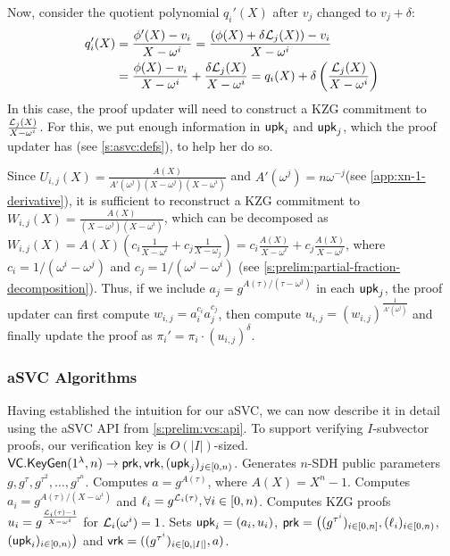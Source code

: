 Now, consider the quotient polynomial $q_i'(X)$ after $v_j$ changed to $v_j+\delta$:
{\ifCameraReady\small\fi
\begin{align}
q_i'(X) &= \frac{\phi'(X)-v_i}{X-\omega^i}=\frac{\left(\phi(X) + \delta\mathcal{L}_j(X)\right) - v_i}{X-\omega^i}\\
        &= \frac{\phi(X) - v_i}{X-\omega^i}+\frac{\delta\mathcal{L}_j(X)}{X-\omega^i} = q_i(X) + \delta\left(\frac{\mathcal{L}_j(X)}{X-\omega^i}\right)
\end{align}
}%
In this case, the proof updater will need to construct a KZG commitment to $\frac{\mathcal{L}_j(X)}{X-\omega^i}$.
For this, we put enough information in $\mathsf{upk}_i$ and $\mathsf{upk}_j$, which the proof updater has (see \cref{s:asvc:defs}), to help her do so.

Since $U_{i,j}(X)=\frac{A(X)}{A'(\omega^j)(X-\omega^j)(X-\omega^i)}$ and $A'(\omega^j) = n\omega^{-j}$\ifNotCameraReady\xspace(see \cref{app:xn-1-derivative})\fi, it is sufficient to reconstruct a KZG commitment to $W_{i,j}(X)=\frac{A(X)}{(X-\omega^j)(X-\omega^i)}$, which can be decomposed as $W_{i,j}(X)=A(X) \left(c_i \frac{1}{X-\omega^i} + c_j \frac{1}{X-\omega_j}\right) = c_i \frac{A(X)}{X-\omega^i} + c_j \frac{A(X)}{X-\omega^j}$, where $c_i = 1/(\omega^i-\omega^j)$ and $c_j=1/(\omega^j-\omega^i)$ (see \cref{s:prelim:partial-fraction-decomposition}).
Thus, if we include $a_j=g^{{A(\tau)}/(\tau-\omega^j)}$ in each $\mathsf{upk}_j$, the proof updater can first compute $w_{i,j} = a_i^{c_i} a_j^{c_j}$, then compute $u_{i,j}=\left(w_{i,j}\right)^{\frac{1}{A'(\omega^j)}}$ and finally update the proof as  $\pi_i' = \pi_i \cdot (u_{i,j})^\delta$.

\subsubsection{aSVC Algorithms}
\label{s:asvc:from-kzg:algorithms}
Having established the intuition for our aSVC, we can now describe it in detail using the aSVC API from \cref{s:prelim:vcs:api}.
\ifNotCameraReady
To support verifying $I$-subvector proofs, our verification key is $O(|I|)$-sized.
\fi
\\

\api $\mathsf{VC}.\mathsf{KeyGen}(1^\lambda, n) \rightarrow \mathsf{prk},\mathsf{vrk},(\mathsf{upk}_j)_{j\in[0,n)}$.
Generates $n$-SDH public parameters $g,g^\tau,g^{\tau^2},\dots,g^{\tau^n}$.
Computes $a=g^{A(\tau)}$, where $A(X)=X^n - 1$.
Computes $a_i=g^{A(\tau)/(X-\omega^i)}$ and $\ell_i = g^{\mathcal{L}_i(\tau)}, \forall i\in[0,n)$.
Computes KZG proofs $u_i=g^{\frac{\mathcal{L}_i(\tau)-1}{X-\omega^i}}$ for $\mathcal{L}_i(\omega^i) = 1$.
Sets
$\mathsf{upk}_i = (a_i, u_i)$,
$\mathsf{prk} = \bigl((g^{\tau^i})_{i\in[0,n]},(\ell_i)_{i\in[0,n)}$, $(\mathsf{upk}_i)_{i\in[0,n)}\bigr)$
and $\mathsf{vrk} = ((g^{\tau^i})_{i\in [0,|I|]},a)$.

